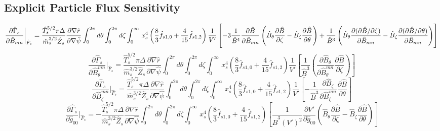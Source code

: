 \documentclass[11pt]{amsart}
\newcommand{\partder}[2]{\dfrac{\partial #1}{\partial #2}} %
\begin{document}
\subsection{Explicit Particle Flux Sensitivity}
\begin{dmath}
\partder{\hat{\Gamma}_s}{\hat{B}_{mn}}  \bigg \rvert_{\hat{F}_s} = \frac{\hat{T}_s^{5/2} \pi \Delta}{\hat{m}_s^{3/2} \hat{Z}_s} \partder{ \nabla \hat{r}}{\nabla \hat{\psi}} \int_0^{2\pi} d \theta \int_0^{2\pi} d \zeta \int_0^{\infty} \, x_s^4 \left(\frac{8}{3} \hat{f}_{s1,0}  + \frac{4}{15} \hat{f}_{s1,2}  \right) \\ \frac{1}{V'} \left[ -3 \frac{1}{\hat{B}^4} \partder{\hat{B}}{\hat{B}_{mn}} \left( \hat{B}_{\theta} \partder{\hat{B}}{\zeta} - \hat{B}_{\zeta} \partder{\hat{B}}{\theta} \right) + \frac{1}{\hat{B}^3} \left( \hat{B}_{\theta} \partder{(\partial \hat{B}/\partial \zeta)}{\hat{B}_{mn}} - \hat{B}_{\zeta} \partder{(\partial \hat{B}/\partial \theta)}{\hat{B}_{mn}} \right) \right]
\end{dmath}
\begin{dmath}
\partder{\hat{\Gamma}_s}{\hat{B}_{\theta}^{mn}}  \bigg \rvert_{\hat{F}_s} = \frac{\hat{T}_s^{5/2} \pi \Delta}{\hat{m}_s^{3/2} \hat{Z}_s} \partder{ \nabla \hat{r}}{\nabla \hat{\psi}} \int_0^{2\pi} d \theta \int_0^{2\pi} d \zeta \int_0^{\infty} \, x_s^4  \left(\frac{8}{3} \hat{f}_{s1,0}  + \frac{4}{15} \hat{f}_{s1,2}  \right) \frac{1}{V'} \left[ \frac{1}{\hat{B}^3} \left( \partder{\hat{B}_{\theta}}{\hat{B}_{\theta}^{mn}} \partder{\hat{B}}{\zeta} \right) \right]
\end{dmath}
\begin{dmath}
\partder{\hat{\Gamma}_s}{\hat{B}_{\zeta}^{mn}} \bigg \rvert_{\hat{F}_s} = \frac{\hat{T}_s^{5/2} \pi \Delta}{\hat{m}_s^{3/2} \hat{Z}_s} \partder{ \nabla \hat{r}}{\nabla \hat{\psi}} \int_0^{2\pi} d \theta \int_0^{2\pi} d \zeta \int_0^{\infty} \, x_s^4  \left(\frac{8}{3} \hat{f}_{s1,0}  + \frac{4}{15} \hat{f}_{s1,2}  \right) \frac{1}{V'} \left[ -\frac{1}{\hat{B}^3} \partder{\hat{B}_{\zeta}}{\hat{B}_{\zeta}^{mn}} \partder{\hat{B}}{\theta} \right]
\end{dmath}
\begin{dmath}
\partder{\hat{\Gamma}_s}{\hat{g}_{00}} \bigg \rvert_{\hat{F}_s}= - \frac{\hat{T}_s^{5/2} \pi \Delta}{\hat{m}_s^{3/2} \hat{Z}_s} \partder{ \nabla \hat{r}}{\nabla \hat{\psi}}\int_0^{2\pi} d \theta \int_0^{2\pi} d \zeta \int_0^{\infty} \, x_s^4 \left(\frac{8}{3} \hat{f}_{s1,0}  + \frac{4}{15} \hat{f}_{s1,2}  \right)  \left[ \frac{1}{ \hat{B}^3 (V')^2 } \partder{V'}{\hat{g}_{00}}  \left( \hat{B}_{\theta} \partder{\hat{B}}{\zeta} - \hat{B}_{\zeta} \partder{\hat{B}}{\theta} \right) \right] 
\end{dmath}
\end{document}

